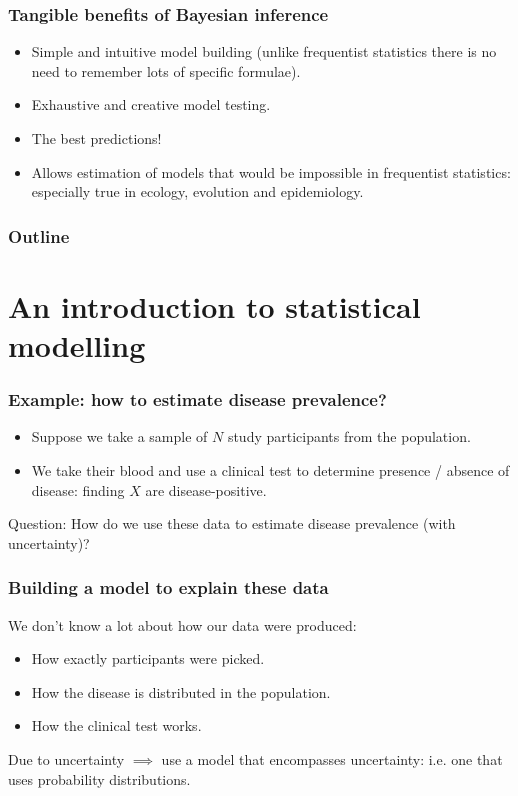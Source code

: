 \documentclass{beamer}
\begin{document}
\begin{frame}
	\frametitle{Tangible benefits of Bayesian inference}
	
	\begin{itemize}
		\item<2-> Simple and intuitive model building (unlike frequentist statistics there is no need to remember lots of specific formulae).
		\item<3-> Exhaustive and creative model testing.
		\item<4-> The best predictions! 
		\item<5-> Allows estimation of models that would be impossible in frequentist statistics: especially true in ecology, evolution and epidemiology.
	\end{itemize}
		
\end{frame}

\begin{frame}
	\frametitle{Outline}
	\tableofcontents
\end{frame}

\section{An introduction to statistical modelling}
\frame{\tableofcontents[currentsection]}

\begin{frame}
	\frametitle{Example: how to estimate disease prevalence?}
	
	\begin{itemize}
		\item Suppose we take a sample of $N$ study participants from the population.
		\item We take their blood and use a clinical test to determine presence / absence of disease: finding $X$ are disease-positive.
	\end{itemize}
	
	Question: How do we use these data to estimate disease prevalence (with uncertainty)?
	
\end{frame}

\begin{frame}
	\frametitle{Building a model to explain these data}
	
	We don't know a lot about how our data were produced:
	
	\begin{itemize}
	\item How exactly participants were picked.
	\item How the disease is distributed in the population.
	\item How the clinical test works.
	\end{itemize}
	
	Due to uncertainty $\implies$ use a model that encompasses uncertainty: i.e. one that uses probability distributions.
	
\end{frame}
\end{document}
